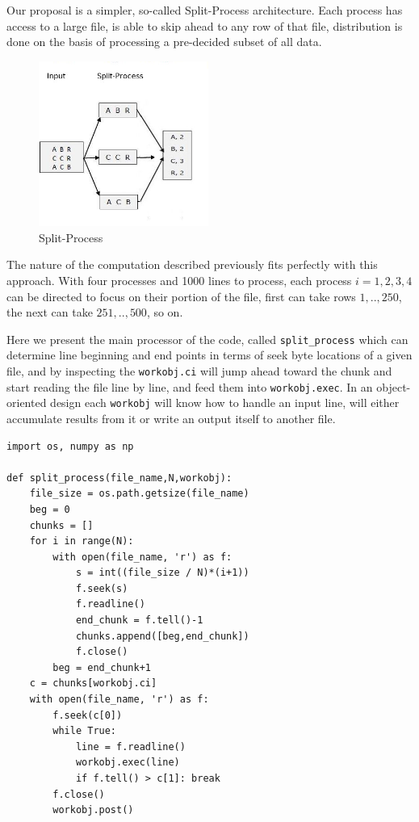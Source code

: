 \documentclass{article}
\begin{document}
Our proposal is a simpler, so-called Split-Process architecture. Each process
has access to a large file, is able to skip ahead to any row of that file,
distribution is done on the basis of processing a pre-decided subset of all
data. 

\begin{figure}[h]
  \centering
  \includegraphics[width=15em]{splitprocess.jpg}
  \caption{Split-Process}
  \label{fig:mapreduce1}
\end{figure}

The nature of the computation described previously fits perfectly with this
approach. With four processes and 1000 lines to process, each process
$i=1,2,3,4$ can be directed to focus on their portion of the file, first can
take rows $1,..,250$, the next can take $251,..,500$, so on.

Here we present the main processor of the code, called \verb!split_process!
which can determine line beginning and end points in terms of seek byte
locations of a given file, and by inspecting the \verb!workobj.ci! will
jump ahead toward the chunk and start reading the file line by line, and
feed them into \verb!workobj.exec!. In an object-oriented design each
\verb!workobj! will know how to handle an input line, will either accumulate
results from it or write an output itself to another file.

\begin{verbatim}
import os, numpy as np

def split_process(file_name,N,workobj):
    file_size = os.path.getsize(file_name)
    beg = 0
    chunks = []
    for i in range(N):
        with open(file_name, 'r') as f:
            s = int((file_size / N)*(i+1))
            f.seek(s)
            f.readline()
            end_chunk = f.tell()-1
            chunks.append([beg,end_chunk])
            f.close()
        beg = end_chunk+1
    c = chunks[workobj.ci]
    with open(file_name, 'r') as f:
        f.seek(c[0])
        while True:
            line = f.readline()
            workobj.exec(line)
            if f.tell() > c[1]: break
        f.close()
        workobj.post()
\end{verbatim}
\end{document}
